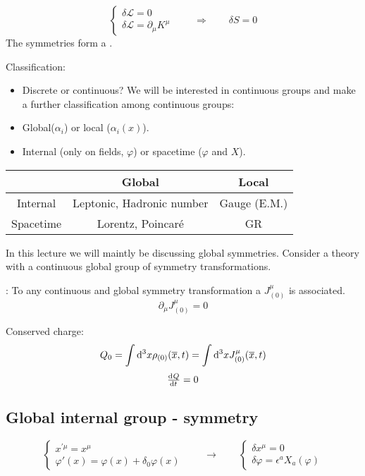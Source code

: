 \[ \begin{cases}
\delta \mathcal{L} = 0 \\ \delta \mathcal{L} = \partial_\mu K^\mu
\end{cases} \qquad \Rightarrow \qquad \delta S = 0\]
The symmetries form a .

Classification:
\begin{itemize}
\item Discrete or continuous? We will be interested in continuous groups and make a further classification among continuous groups:
\item Global($\alpha_i$) or local ($\alpha_i(x)$).
\item Internal (only on fields, $\varphi$) or spacetime ($\varphi$ and $X$).
\end{itemize}

\begin{tabular}{c | c c}
& Global & Local \\ \hline
Internal & Leptonic, Hadronic number & Gauge (E.M.)\\
Spacetime & Lorentz, Poincaré & GR
\end{tabular}

In this lecture we will maintly be discussing global symmetries.
Consider a theory with a continuous global group of symmetry transformations.

\begin{eigenschap}
: To any continuous and global symmetry transformation a  $J^\mu_{(0)}$ is associated.
\[ \partial_\mu J^\mu_{(0)} = 0 \]
\end{eigenschap}

Conserved charge:
\[ Q_0 = \int \operatorname{d \!}{^3x}\rho_{(0)}(\overline{x},t) = \int \operatorname{d \!}{^3x}J^\mu_{(0)}(\overline{x},t) \]
\[ \od{Q}{t} =0 \]

\subsection{Global internal group - symmetry}
\[ \begin{cases}
x^{\prime\mu} = x^\mu \\ \varphi'(x) = \varphi(x) + \delta_0\varphi(x)
\end{cases} \qquad \to \qquad \begin{cases}
\delta x^\mu = 0 \\ \delta \varphi = \epsilon^a X_a(\varphi)
\end{cases} \]

